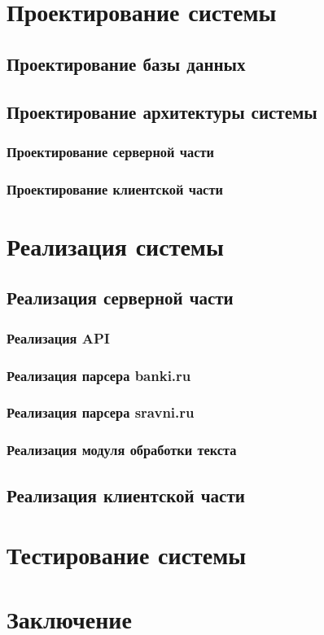 \documentclass[PI, VKR]{HSEUniversity}
\begin{document}
\chapter{Проектирование системы}
\label{sec:orgf20e9f0}
\section{Проектирование базы данных}
\label{sec:org6e411fc}

\section{Проектирование архитектуры системы}
\label{sec:org4b21fc5}
\subsection{Проектирование серверной части}
\label{sec:orgfbf68c5}
\subsection{Проектирование клиентской части}
\label{sec:orgfd93481}

\chapter{Реализация системы}
\label{sec:org34a84ee}
\section{Реализация серверной части}
\label{sec:orgd5f43d7}
\subsection{Реализация API}
\label{sec:orgb704a29}
\subsection{Реализация парсера banki.ru}
\label{sec:org68a1c83}
\subsection{Реализация парсера sravni.ru}
\label{sec:orgbcd1bb6}
\subsection{Реализация модуля обработки текста}
\label{sec:org7bd4205}
\section{Реализация клиентской части}
\label{sec:orgbdf6fa6}
\chapter{Тестирование системы}
\label{sec:org3f42e0b}
\chapter*{Заключение}
\label{sec:org0833c48}
\putbibliography
\appendix
\end{document}
